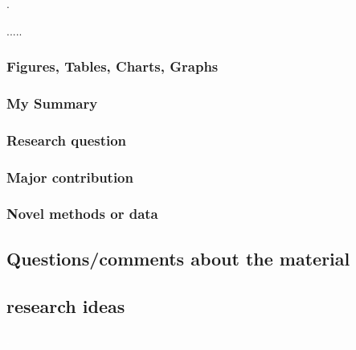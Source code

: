 \documentclass[12pt]{article}
\begin{document}
			\begin{outline}[enumerate]

			\1 .



		\0 .....

			\end{outline}



			\subsubsection*{Figures, Tables, Charts, Graphs}



			\subsubsection*{My Summary}

			

			\subsubsection*{Research question}

			

			\subsubsection*{Major contribution}

				

			\subsubsection*{Novel methods or data}



			\subsection*{Questions/comments about the material}



			\subsection*{research ideas}





\pagebreak



	











\newpage

\singlespacing

{\textcolor{white}.}




\end{document}
